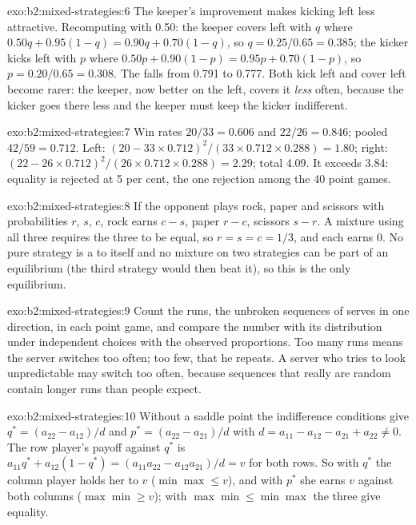 \begin{solution}{exo:b2:mixed-strategies:6}
The keeper's improvement makes kicking left less attractive. Recomputing with 0.50: the keeper covers left with
$q$ where $0.50q + 0.95(1 - q) = 0.90q + 0.70(1 - q)$, so $q = 0.25/0.65 = 0.385$; the kicker kicks left with $p$ where $0.50p +
0.90(1 - p) = 0.95p + 0.70(1 - p)$, so $p = 0.20/0.65 = 0.308$. The  falls from 0.791 to 0.777. Both kick left and
cover left become rarer: the keeper, now better on the left, covers it \emph{less} often, because the kicker
goes there less and the keeper must keep the kicker indifferent.
\end{solution}

\begin{solution}{exo:b2:mixed-strategies:7}
Win rates $20/33 = 0.606$ and $22/26 = 0.846$; pooled $42/59 = 0.712$. Left: $(20 - 33 \times 0.712)^2/(33 \times 0.712 \times
0.288) = 1.80$; right: $(22 - 26 \times 0.712)^2/(26 \times 0.712 \times 0.288) = 2.29$; total 4.09. It exceeds 3.84: equality is
rejected at 5 per cent, the one rejection among the 40 point games.
\end{solution}

\begin{solution}{exo:b2:mixed-strategies:8}
If the opponent plays rock, paper and scissors with probabilities $r$, $s$, $c$, rock earns $c - s$, paper $r - c$, scissors
$s - r$. A mixture using all three requires the three to be equal, so $r = s = c = 1/3$, and each earns 0. No pure
strategy is a  to itself and no mixture on two strategies can be part of an equilibrium (the
third strategy would then beat it), so this is the only equilibrium.
\end{solution}

\begin{solution}{exo:b2:mixed-strategies:9}
Count the runs, the unbroken sequences of serves in one direction, in each point game, and compare the
number with its distribution under independent choices with the observed proportions. Too many runs means
the server switches too often; too few, that he repeats. A server who tries to look unpredictable may switch
too often, because sequences that really are random contain longer runs than people expect.
\end{solution}

\begin{solution}{exo:b2:mixed-strategies:10}
Without a saddle point the indifference conditions give $q^* = (a_{22} - a_{12})/d$ and $p^* = (a_{22} - a_{21})/d$ with $d =
a_{11} - a_{12} - a_{21} + a_{22} \ne 0$. The row player's payoff against $q^*$ is $a_{11}q^* + a_{12}(1 - q^*) = (a_{11}a_{22} -
a_{12}a_{21})/d = v$ for both rows. So with $q^*$ the column player holds her to $v$ ($\min\max \le v$), and with $p^*$ she
earns $v$ against both columns ($\max\min \ge v$); with $\max\min \le \min\max$ the three give equality.
\end{solution}

